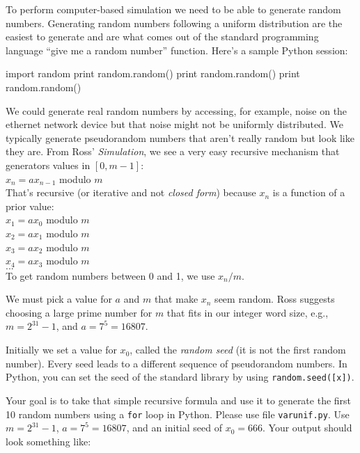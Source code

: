 \begin{fullwidth}

To perform computer-based simulation we need to be able to generate random numbers. Generating random numbers following a uniform distribution are the easiest to generate and are what comes out of the standard programming language ``give me a random number'' function.  Here's a sample Python session:

\begin{pyconsole}
import random
print random.random()
print random.random()
print random.random()
\end{pyconsole}

We could generate real random numbers by accessing, for example, noise on the ethernet network device but that noise might not be uniformly distributed. We typically generate pseudorandom numbers that aren't really random but look like they are. From Ross' {\em Simulation},  we see a very easy recursive mechanism that generators values in $[0,m-1]$:\\

$x_n = a x_{n-1}$ modulo $m$\\

That's recursive (or iterative and not {\em closed form}) because $x_n$ is a function of a prior value: \\

$x_1 = ax_0$ modulo $m$\\
$x_2 = ax_1$ modulo $m$\\
$x_3 = ax_2$ modulo $m$\\
$x_4 = ax_3$ modulo $m$\\
$...$\\

\noindent To get random numbers between 0 and 1, we use $x_n / m$.

We must pick a value for $a$ and $m$ that make $x_n$ seem random. Ross suggests choosing a large prime number for $m$ that fits in our integer word size, e.g., $m = 2^{31} - 1$, and $a = 7^5 = 16807$.

Initially we set a value for $x_0$, called the {\em random seed} (it is not the first random number). Every seed leads to a different sequence of pseudorandom numbers. In Python, you can set the seed of the standard library by using {\tt random.seed([x])}.

Your goal is to take that simple recursive formula and use it to generate the first 10 random numbers using a {\tt for} loop in Python. Please use file {\tt varunif.py}. Use $m = 2^{31} - 1$, $a = 7^5 = 16807$, and an initial seed of $x_0 = 666$.  Your output should look something like:


\end{fullwidth}

